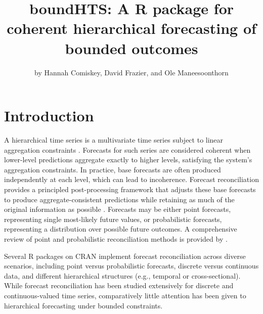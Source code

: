 \title{boundHTS: A R package for coherent hierarchical forecasting of bounded outcomes}


\author{by Hannah Comiskey, David Frazier, and Ole Maneesoonthorn}

\maketitle


\section{Introduction}\label{introduction}

A hierarchical time series is a multivariate time series subject to linear aggregation constraints \citep{Hyndman2022}. Forecasts for such series are considered coherent when lower-level predictions aggregate exactly to higher levels, satisfying the system's aggregation constraints. In practice, base forecasts are often produced independently at each level, which can lead to incoherence. Forecast reconciliation provides a principled post-processing framework that adjusts these base forecasts to produce aggregate-consistent predictions while retaining as much of the original information as possible \citep{Hyndman2021}. Forecasts may be either point forecasts, representing single most-likely future values, or probabilistic forecasts, representing a distribution over possible future outcomes. A comprehensive review of point and probabilistic reconciliation methods is provided by \cite{Athanasopoulos2024}.

Several R packages on CRAN implement forecast reconciliation across diverse scenarios, including point versus probabilistic forecasts, discrete versus continuous data, and different hierarchical structures (e.g., temporal or cross-sectional). While forecast reconciliation has been studied extensively for discrete and continuous-valued time series, comparatively little attention has been given to hierarchical forecasting under bounded constraints.


